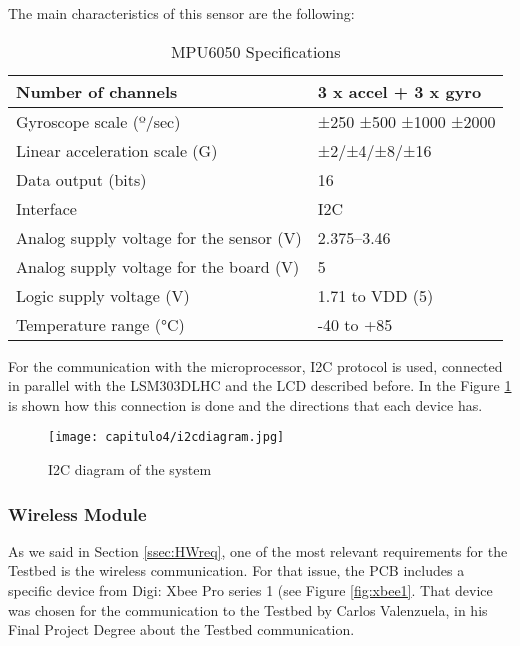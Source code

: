 The main characteristics of this sensor are the following:
\begin{table}[H]
\centering
\begin{tabular}{|l|l|}
\hline
Number of channels & 3 x accel + 3 x gyro \\ \hline
Gyroscope scale        (º/sec)     & ±250 ±500 ±1000 ±2000      \\ \hline
Linear acceleration scale     (G)         &  ±2/±4/±8/±16         \\ \hline
Data output (bits)          & 16                                               \\ \hline
Interface        & I2C                          \\ \hline
Analog supply voltage for the sensor (V) & 2.375–3.46                                      \\ \hline
Analog supply voltage for the board (V)     & 5         \\ \hline
Logic supply voltage (V)     & 1.71 to VDD (5)         \\ \hline
Temperature range (°C)  & -40 to +85                                          \\ \hline
\end{tabular}
\caption{MPU6050 Specifications \cite{MPU6050} }\label{tab:MPU6050tab}
\end{table}


For the communication with the microprocessor, I2C protocol is used, connected in parallel with the LSM303DLHC and the LCD described before. In the Figure \ref{fig:i2cdiagram} is shown how this connection is done and the directions that each device has. 

  
\begin{figure}[H]
	\centering
		\texttt{[image: capitulo4/i2cdiagram.jpg]}
	\caption{I2C diagram of the system}
	\label{fig:i2cdiagram}
\end{figure}

\subsubsection{Wireless Module} \label{sssec:xbee}

As we said in Section \ref{ssec:HWreq}, one of the most relevant requirements for the Testbed is the wireless communication. For that issue, the \acrshort{PCB} includes a specific device from Digi: Xbee Pro series 1 (see Figure \ref{fig:xbee1}. That device was chosen for the communication to the Testbed by Carlos Valenzuela, in his Final Project Degree about the Testbed communication. \cite{carlos}
  
